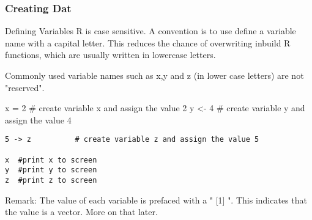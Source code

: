 \begin{frame}[fragile]
\frametitle{Creating Dat}
Defining Variables 
R is case sensitive.
A convention is to use define a variable name with a capital letter. This reduces the chance of overwriting inbuild R functions, which are usually written in lowercase letters.
\end{frame}
\begin{frame}[fragile]
Commonly used variable names such as x,y and z (in lower case letters) are not "reserved".

x = 2           # create variable x and assign the value 2
y <- 4          # create variable y and assign the value 4
\end{frame}
\begin{frame}[fragile]
\begin{framed}
\begin{verbatim}
5 -> z          # create variable z and assign the value 5

x  #print x to screen
y  #print y to screen
z  #print z to screen
\end{verbatim}

\end{framed}

Remark: The value of each variable is prefaced with a " [1] ". This indicates that the value is a vector. More on that later.

\end{frame}

